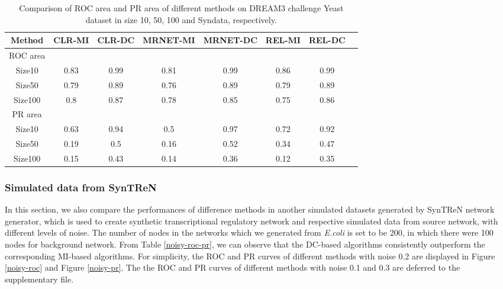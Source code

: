 \documentclass{bioinfo}
\begin{document}
\begin{table}[0.5\textwidth] \tiny
\centering \caption{Comparison of ROC area and PR area of different methods on DREAM3 challenge Yeast dataset in size 10, 50, 100 and Syndata,
respectively.}\label{roc-pr}
\begin{tabular}{cccccccc}
 \hline
 Method & CLR-MI & CLR-DC & MRNET-MI & MRNET-DC & REL-MI & REL-DC \\
 \hline
  ROC area\\
 Size10 & 0.83 & 0.99 & 0.81 & 0.99 & 0.86 & 0.99  \\
 Size50 & 0.79 & 0.89 & 0.76 & 0.89 & 0.79 & 0.89 \\
 Size100 & 0.8 & 0.87 & 0.78 & 0.85 & 0.75 & 0.86 \\
 PR area\\
 Size10 & 0.63 & 0.94 & 0.5 & 0.97 & 0.72 & 0.92  \\
 Size50 & 0.19 & 0.5 & 0.16 & 0.52 & 0.34 & 0.47  \\
 Size100 & 0.15 & 0.43 & 0.14 & 0.36 & 0.12 & 0.35 \\
  \hline
\end{tabular}
\end{table}


\subsubsection{Simulated data from SynTReN}

In this section, we also compare the performances of difference
methods in another simulated datasets generated by SynTReN network
generator, which is used to create synthetic transcriptional
regulatory network and respective simulated data from source
network,  with different levels of noise. The number of nodes in the
networks which we generated from \emph{E.coli} is set to be 200, in
which there were 100 nodes for background network. From Table
\ref{noisy-roc-pr}, we can observe that the DC-based algorithms
consistently outperform the corresponding MI-based algorithms.  For
simplicity, the ROC and PR curves of different methods with noise
0.2 are displayed in Figure \ref{noisy-roc} and Figure
\ref{noisy-pr}. The the ROC and PR curves of different methods with
noise 0.1 and 0.3 are deferred to the supplementary file.

%
\end{document}
